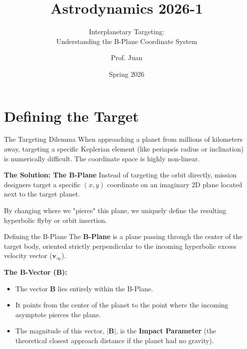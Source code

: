\documentclass[11pt]{beamer}
\title[The B-Plane]{Astrodynamics 2026-1}
\subtitle{Interplanetary Targeting: \\ Understanding the B-Plane Coordinate System}
\author{Prof. Juan}
\institute{Universidad de Antioquia - Aerospace Engineering}
\date{Spring 2026}
\begin{document}
\begin{frame}
    \titlepage
\end{frame}

\section{Defining the Target}

\begin{frame}{The Targeting Dilemma}
    When approaching a planet from millions of kilometers away, targeting a specific Keplerian element (like periapsis radius or inclination) is numerically difficult. The coordinate space is highly non-linear.
    
    \vspace{0.3cm}
    \textbf{The Solution: The B-Plane}
    Instead of targeting the orbit directly, mission designers target a specific $(x, y)$ coordinate on an imaginary 2D plane located next to the target planet. 
    
    \vspace{0.2cm}
    By changing where we "pierce" this plane, we uniquely define the resulting hyperbolic flyby or orbit insertion.
\end{frame}

\begin{frame}{Defining the B-Plane}
    The \textbf{B-Plane} is a plane passing through the center of the target body, oriented strictly perpendicular to the incoming hyperbolic excess velocity vector ($\bm{v}_\infty$).
    
    \vspace{0.3cm}
    \textbf{The B-Vector ($\bm{B}$):}
    \begin{itemize}
        \item The vector $\bm{B}$ lies entirely within the B-Plane.
        \item It points from the center of the planet to the point where the incoming asymptote pierces the plane.
        \item The magnitude of this vector, $|\bm{B}|$, is the \textbf{Impact Parameter} (the theoretical closest approach distance if the planet had no gravity).
    \end{itemize}
\end{frame}

\end{document}
